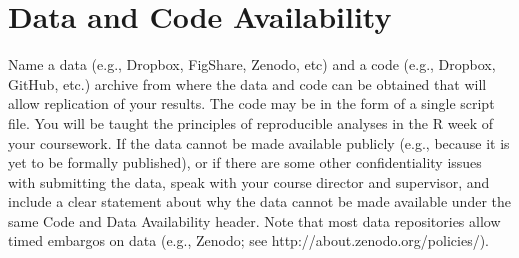 \chapter{Data and Code Availability}

Name a data (e.g., Dropbox, FigShare, Zenodo, etc) and a code (e.g., Dropbox, GitHub, etc.) archive from where the data and code can be obtained that will allow replication of your results. The code may be in the form of a single script file. You will be taught the principles of reproducible analyses in the R week of your coursework. If the data cannot be made available publicly (e.g., because it is yet to be formally published), or if there are some other confidentiality issues with submitting the data, speak with your course director and supervisor, and include a clear statement about why the data cannot be made available under the same Code and Data Availability header. Note that most data repositories allow timed embargos on data (e.g., Zenodo; see http://about.zenodo.org/policies/).